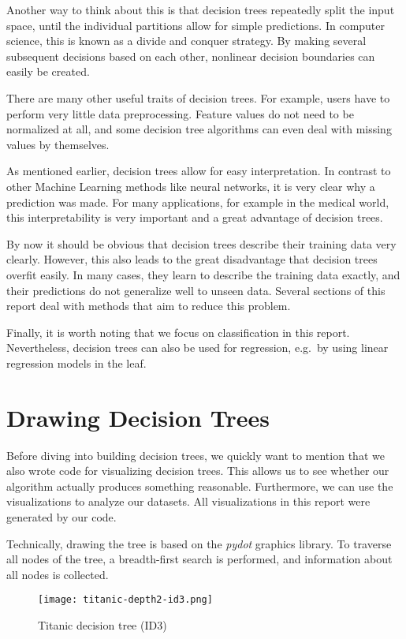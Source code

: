 \documentclass[a4paper]{article}
\begin{document}
Another way to think about this is that decision trees repeatedly split the input space, until the individual partitions allow for simple predictions. In computer science, this is known as a divide and conquer strategy. By making several subsequent decisions based on each other, nonlinear decision boundaries can easily be created.

There are many other useful traits of decision trees. For example, users have to perform very little data preprocessing. Feature values do not need to be normalized at all, and some decision tree algorithms can even deal with missing values by themselves.

As mentioned earlier, decision trees allow for easy interpretation. In contrast to other Machine Learning methods like neural networks, it is very clear why a prediction was made. For many applications, for example in the medical world, this interpretability is very important and a great advantage of decision trees.

By now it should be obvious that decision trees describe their training data very clearly. However, this also leads to the great disadvantage that decision trees overfit easily. In many cases, they learn to describe the training data exactly, and their predictions do not generalize well to unseen data. Several sections of this report deal with methods that aim to reduce this problem.

Finally, it is worth noting that we focus on classification in this report. Nevertheless, decision trees can also be used for regression, e.g.\ by using linear regression models in the leaf.

\section{Drawing Decision Trees}

Before diving into building decision trees, we quickly want to mention that we also wrote code for visualizing decision trees. This allows us to see whether our algorithm actually produces something reasonable. Furthermore, we can use the visualizations to analyze our datasets. All visualizations in this report were generated by our code.

Technically, drawing the tree is based on the \emph{pydot} graphics library. To traverse all nodes of the tree, a breadth-first search is performed, and information about all nodes is collected.

\begin{figure}[h]
	\texttt{[image: titanic-depth2-id3.png]}
    \caption{Titanic decision tree (ID3)}
    \label{fig:drawing-titanic}
\end{figure}
\end{document}
